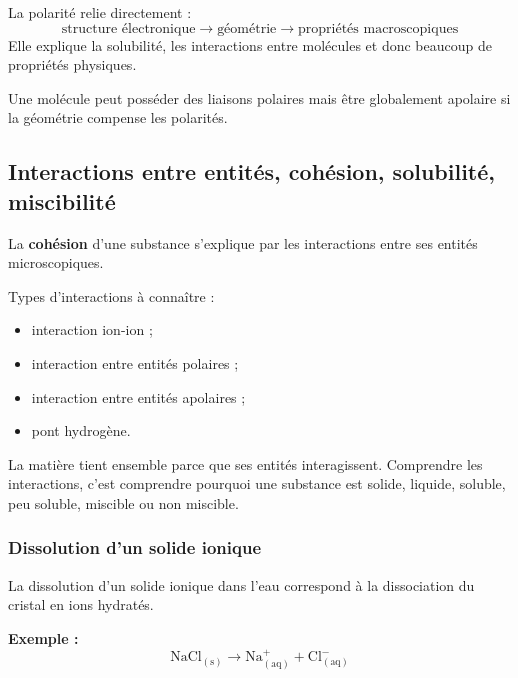 \documentclass[11pt,a4paper]{article}
\begin{document}
\begin{sensbox}
La polarité relie directement :
\[
\text{structure électronique} \longrightarrow \text{géométrie} \longrightarrow \text{propriétés macroscopiques}
\]
Elle explique la solubilité, les interactions entre molécules et donc beaucoup de propriétés physiques.
\end{sensbox}

\begin{attentionbox}
Une molécule peut posséder des liaisons polaires mais être globalement apolaire si la géométrie compense les polarités.
\end{attentionbox}

\subsection{Interactions entre entités, cohésion, solubilité, miscibilité}

\begin{definitionbox}
La \textbf{cohésion} d'une substance s'explique par les interactions entre ses entités microscopiques.
\end{definitionbox}

Types d'interactions à connaître :
\begin{itemize}
    \item interaction ion-ion ;
    \item interaction entre entités polaires ;
    \item interaction entre entités apolaires ;
    \item pont hydrogène.
\end{itemize}

\begin{sensbox}
La matière tient ensemble parce que ses entités interagissent.  
Comprendre les interactions, c'est comprendre pourquoi une substance est solide, liquide, soluble, peu soluble, miscible ou non miscible.
\end{sensbox}

\subsubsection{Dissolution d'un solide ionique}

\begin{definitionbox}
La dissolution d'un solide ionique dans l'eau correspond à la dissociation du cristal en ions hydratés.
\end{definitionbox}

\textbf{Exemple :}
\[
\mathrm{NaCl_{(s)} \rightarrow Na^+_{(aq)} + Cl^-_{(aq)}}
\]
\end{document}
